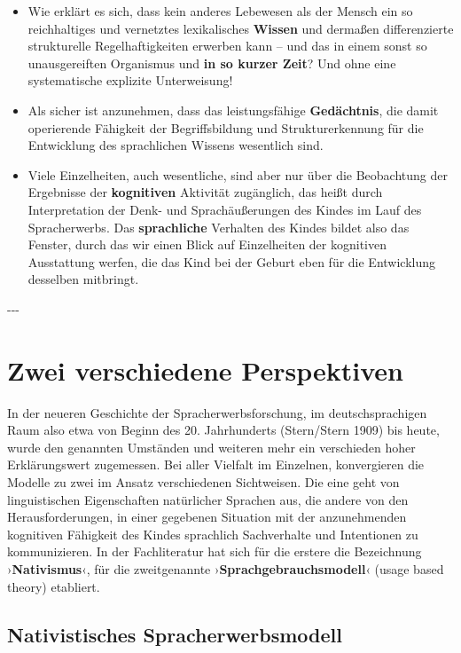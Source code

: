 \documentclass[
  letterpaper,
]{scrbook}
\begin{document}
\begin{itemize}
\item
  Wie erklärt es sich, dass kein anderes Lebewesen als der Mensch ein so
  reichhaltiges und vernetztes lexikalisches \textbf{Wissen} und
  dermaßen differenzierte strukturelle Regelhaftigkeiten erwerben kann
  -- und das in einem sonst so unausgereiften Organismus und \textbf{in
  so kurzer Zeit}? Und ohne eine systematische explizite Unterweisung!
\item
  Als sicher ist anzunehmen, dass das leistungsfähige
  \textbf{Gedächtnis}, die damit operierende Fähigkeit der
  Begriffsbildung und Strukturerkennung für die Entwicklung des
  sprachlichen Wissens wesentlich sind.
\item
  Viele Einzelheiten, auch wesentliche, sind aber nur über die
  Beobachtung der Ergebnisse der \textbf{kognitiven} Aktivität
  zugänglich, das heißt durch Interpretation der Denk- und
  Sprachäußerungen des Kindes im Lauf des Spracherwerbs. Das
  \textbf{sprachliche} Verhalten des Kindes bildet also das Fenster,
  durch das wir einen Blick auf Einzelheiten der kognitiven Ausstattung
  werfen, die das Kind bei der Geburt eben für die Entwicklung desselben
  mitbringt.
\end{itemize}

-\/-\/-

\hypertarget{zwei-verschiedene-perspektiven}{%
\section{Zwei verschiedene
Perspektiven}\label{zwei-verschiedene-perspektiven}}

In der neueren Geschichte der Spracherwerbsforschung, im
deutschsprachigen Raum also etwa von Beginn des 20. Jahrhunderts
(Stern/Stern 1909) bis heute, wurde den genannten Umständen und weiteren
mehr ein verschieden hoher Erklärungswert zugemessen. Bei aller Vielfalt
im Einzelnen, konvergieren die Modelle zu zwei im Ansatz verschiedenen
Sichtweisen. Die eine geht von linguistischen Eigenschaften natürlicher
Sprachen aus, die andere von den Herausforderungen, in einer gegebenen
Situation mit der anzunehmenden kognitiven Fähigkeit des Kindes
sprachlich Sachverhalte und Intentionen zu kommunizieren. In der
Fachliteratur hat sich für die erstere die Bezeichnung
›\textbf{Nativismus}‹, für die zweitgenannte
›\textbf{Sprachgebrauchsmodell}‹ (usage based theory) etabliert.\\

\hypertarget{nativistisches-spracherwerbsmodell}{%
\subsection{Nativistisches
Spracherwerbsmodell}\label{nativistisches-spracherwerbsmodell}}
\end{document}
